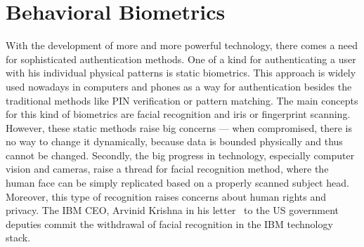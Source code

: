 \section{Behavioral Biometrics}\label{sec:behavioral-biometrics}
With the development of more and more powerful technology, there comes a need for sophisticated authentication methods.
One of a kind for authenticating a user with his individual physical patterns is static biometrics.
This approach is widely used nowadays in computers and phones as a way for authentication besides the traditional methods like PIN verification or pattern matching.
The main concepts for this kind of biometrics are facial recognition and iris or fingerprint scanning.
However, these static methods raise big concerns --- when compromised, there is no way to change it dynamically, because data is bounded physically and thus cannot be changed.
Secondly, the big progress in technology, especially computer vision and cameras, raise a thread for facial recognition method, where the human face can be simply replicated based on a properly scanned subject head.
Moreover, this type of recognition raises concerns about human rights and privacy.
The IBM CEO, Arvinid Krishna in his letter~\cite{ibm_2020} to the US government deputies commit the withdrawal of facial recognition in the IBM technology stack.

